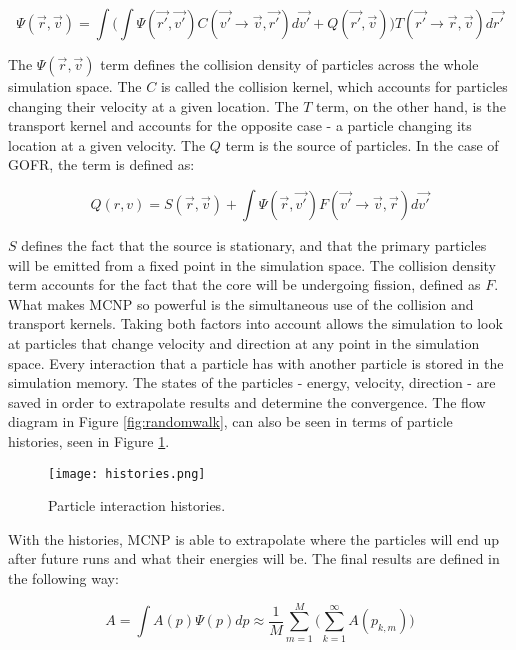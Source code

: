 \begin{equation}
\Psi(\vec{r},\vec{v}) = \int\Big(\int\Psi(\vec{r'},\vec{v'})C(\vec{v'}\rightarrow \vec{v},\vec{r'})d\vec{v'} + Q(\vec{r'},\vec{v})\Big)T(\vec{r'}\rightarrow \vec{r},\vec{v})d\vec{r'}
\end{equation}

The $\Psi(\vec{r},\vec{v})$ term defines the collision density of particles across the whole simulation space. The $C$ is called the collision kernel, which accounts for particles changing their velocity at a given location. The $T$ term, on the other hand, is the transport kernel and accounts for the opposite case - a particle changing its location at a given velocity. The $Q$ term is the source of particles. In the case of GOFR, the term is defined as:

\begin{equation}
Q(r,v) = S(\vec{r},\vec{v}) + \int\Psi(\vec{r},\vec{v'})F(\vec{v'}\rightarrow \vec{v},\vec{r})d\vec{v'}
\end{equation}

$S$ defines the fact that the source is stationary, and that the primary particles will be emitted from a fixed point in the simulation space. The collision density term accounts for the fact that the core will be undergoing fission, defined as $F$. What makes MCNP so powerful is the simultaneous use of the collision and transport kernels. Taking both factors into account allows the simulation to look at particles that change velocity and direction at any point in the simulation space. Every interaction that a particle has with another particle is stored in the simulation memory. The states of the particles - energy, velocity, direction - are saved in order to extrapolate results and determine the convergence. The flow diagram in Figure \ref{fig:randomwalk}, can also be seen in terms of particle histories, seen in Figure \ref{fig:histories}.

\begin{figure}[!htbp]
\centering
\texttt{[image: histories.png]}
\caption{Particle interaction histories.}
\label{fig:histories}
\end{figure}

With the histories, MCNP is able to extrapolate where the particles will end up after future runs and what their energies will be. The final results are defined in the following way:

\begin{equation*}
A = \int A(p)\Psi(p)dp \approx \frac{1}{M}\sum_{m=1}^M\Big(\sum_{k=1}^\infty A(p_{k,m})\Big)
\end{equation*}

